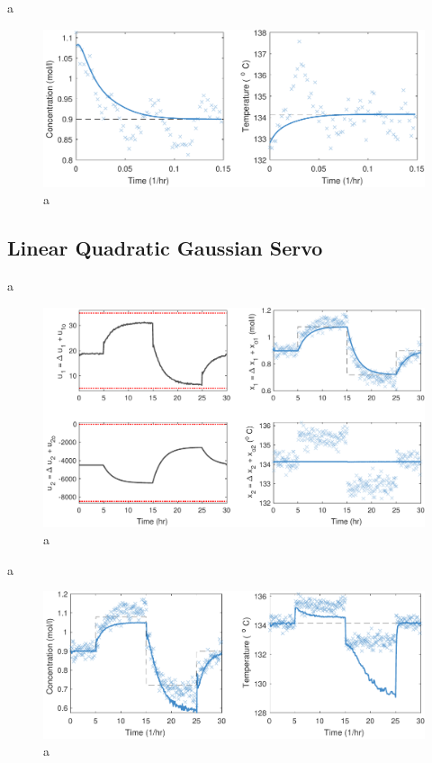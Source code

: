 \documentclass[a4paper,11pt]{book}
\numberwithin{figure}{chapter}
\numberwithin{equation}{chapter}
\numberwithin{table}{chapter}
\theoremstyle{definition}
\begin{document}
a

\begin{figure}[ht] \centering
	\includegraphics[width=\textwidth]{chapter7/lqg04}
	\caption{a}
	\label{fig:lqg04}
\end{figure}	


\subsection{Linear Quadratic Gaussian Servo}

a

\begin{figure}[ht] \centering
	\includegraphics[width=\textwidth]{chapter7/lqgi01}
	\caption{a}
	\label{fig:lqgi01}
\end{figure}

a

\begin{figure}[ht] \centering
	\includegraphics[width=\textwidth]{chapter7/lqgi02}
	\caption{a}
	\label{fig:lqgi02}
\end{figure}	
\end{document}
